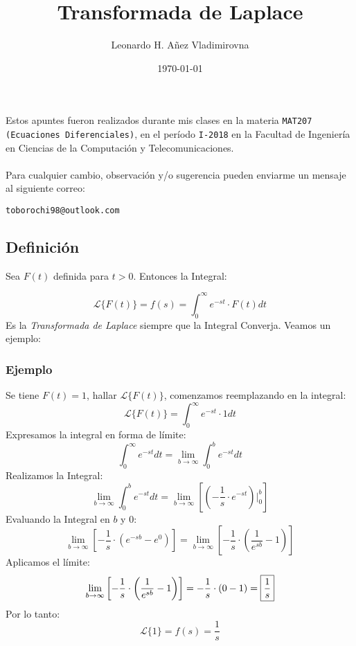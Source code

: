 

\title{Transformada de Laplace}

\author{Leonardo H. Añez Vladimirovna}
\date{\today}

\maketitle

Estos apuntes fueron realizados durante mis clases en la materia \texttt{MAT207 (Ecuaciones Diferenciales)}, en el período \texttt{I-2018} en la Facultad de Ingeniería en Ciencias de la Computación y Telecomunicaciones. 
\\ \vspace{0.5cm} \\
Para cualquier cambio, observación y/o sugerencia pueden enviarme un mensaje al siguiente correo:
\begin{center}
 \texttt{toborochi98@outlook.com}
\end{center}

\subsection*{Definición} Sea $F(t)$ definida para $t>0$. Entonces la Integral:

$$\mathscr{L} \lbrace F(t)\rbrace = f(s) = \displaystyle\int_{0}^{\infty} e^{-st}\cdot F(t) dt$$
Es la \textit{Transformada de Laplace} siempre que la Integral Converja. Veamos un ejemplo: 
\subsubsection*{Ejemplo}
Se tiene $F(t)=1$, hallar $\mathscr{L} \lbrace F(t)\rbrace$, comenzamos reemplazando en la integral:
$$\mathscr{L} \lbrace F(t)\rbrace=\displaystyle\int_{0}^{\infty} e^{-st}\cdot 1 dt$$
Expresamos la integral en forma de límite:
$$\displaystyle\int_{0}^{\infty} e^{-st} dt = \lim_{b\to\infty} \displaystyle\int_{0}^{b} e^{-st} dt$$
Realizamos la Integral:
$$\lim_{b\to\infty} \displaystyle\int_{0}^{b} e^{-st} dt = \lim_{b\to\infty}\left[ \left( -\dfrac{1}{s}\cdot e^{-st} \right)\Bigg|_0^b \right] $$
Evaluando la Integral en $b$ y $0$:
$$\lim_{b\to\infty}\left[  -\dfrac{1}{s}\cdot \left( e^{-sb} - e^0\right) \right] = \lim_{b\to\infty}\left[  -\dfrac{1}{s}\cdot \left( \dfrac{1}{e^{sb}} - 1\right) \right] $$
Aplicamos el límite:
$$\lim_{b\to\infty}\left[  -\dfrac{1}{s}\cdot \left( \dfrac{1}{e^{sb}} - 1\right) \right]=-\dfrac{1}{s}\cdot(0-1)= \fbox{$\dfrac{1}{s}$}$$
Por lo tanto:
$$\mathscr{L} \lbrace 1\rbrace=f(s)=\dfrac{1}{s}$$
\pagebreak
